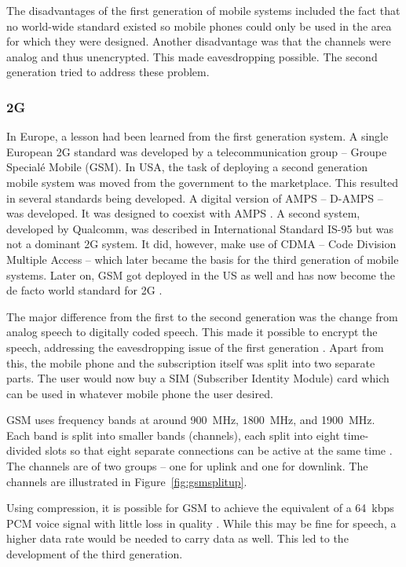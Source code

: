 The disadvantages of the first generation of mobile systems included the fact that no world-wide standard existed so mobile phones could only be used in the area for which they were designed. Another disadvantage was that the channels were analog and thus unencrypted. This made eavesdropping possible. The second generation tried to address these problem.

\subsubsection{2G}
In Europe, a lesson had been learned from the first generation system. A single European 2G standard was developed by a telecommunication group -- Groupe Special\'{e} Mobile (GSM). In USA, the task of deploying a second generation mobile system was moved from the government to the marketplace. This resulted in several standards being developed. A digital version of AMPS -- D-AMPS -- was developed. It was designed to coexist with AMPS \cite{tanenbaum2012computer}. A second system, developed by Qualcomm, was described in International Standard IS-95 but was not a dominant 2G system. It did, however, make use of CDMA -- Code Division Multiple Access -- which later became the basis for the third generation of mobile systems. Later on, GSM got deployed in the US as well and has now become the de facto world standard for 2G \cite{ramjee1998universal}.

The major difference from the first to the second generation was the change from analog speech to digitally coded speech. This made it possible to encrypt the speech, addressing the eavesdropping issue of the first generation \cite{tanenbaum2012computer}. Apart from this, the mobile phone and the subscription itself was split into two separate parts. The user would now buy a SIM (Subscriber Identity Module) card which can be used in whatever mobile phone the user desired.

GSM uses frequency bands at around \SI{900}{MHz}, \SI{1800}{MHz}, and \SI{1900}{MHz}. Each band is split into smaller bands (channels), each split into eight time-divided slots so that eight separate connections can be active at the same time \cite{tanenbaum2012computer}. The channels are of two groups -- one for uplink and one for downlink. The channels are illustrated in Figure~\ref{fig:gsmsplitup}. 

Using compression, it is possible for GSM to achieve the equivalent of a \SI{64}{kbps} PCM voice signal with little loss in quality \cite{tanenbaum2012computer}. While this may be fine for speech, a higher data rate would be needed to carry data as well. This led to the development of the third generation.

